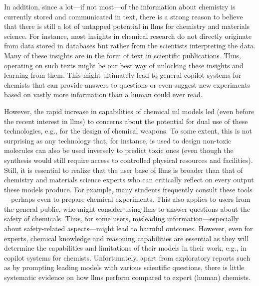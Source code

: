 \documentclass[11pt, oneside]{article}
\begin{document}
\begin{refsection}
In addition, since a lot---if not most---of the information about chemistry is currently stored and communicated in text, there is a strong reason to believe that there is still a lot of untapped potential in \glspl{llm} for chemistry and materials science.\autocite{miret2024llms}
For instance, most insights in chemical research do not directly originate from data stored in databases but rather from the scientists interpreting the data.
Many of these insights are in the form of text in scientific publications.
Thus, operating on such texts might be our best way of unlocking these insights and learning from them.
This might ultimately lead to general copilot systems for chemists that can provide answers to questions or even suggest new experiments based on vastly more information than a human could ever read.

However, the rapid increase in capabilities of chemical \gls{ml} models led (even before the recent interest in \glspl{llm}) to concerns about the potential for dual use of these technologies, e.g., for the design of chemical weapons.\autocite{gopal2023releasing, ganguli2022red, Urbina_2022, campbell2023censoring, moulange2023towards, urbina2022teachable}
To some extent, this is not surprising as any technology that, for instance, is used to design non-toxic molecules can also be used inversely to predict toxic ones (even though the synthesis would still require access to controlled physical resources and facilities).
Still, it is essential to realize that the user base of \glspl{llm} is broader than that of chemistry and materials science experts who can critically reflect on every output these models produce.
For example, many students frequently consult these tools---perhaps even to prepare chemical experiments.\autocite{Intelligent.com_2023}
This also applies to users from the general public, who might consider using \glspl{llm} to answer questions about the safety of chemicals.
Thus, for some users, misleading information---especially about safety-related aspects---might lead to harmful outcomes.
However, even for experts, chemical knowledge and reasoning capabilities are essential as they will determine the capabilities and limitations of their models in their work, e.g., in copilot systems for chemists.
Unfortunately, apart from exploratory reports such as by prompting leading models with various scientific questions,\autocite{ai4science2023impact} there is little systematic evidence on how \glspl{llm} perform compared to expert (human) chemists.


\end{refsection}
\end{document}

